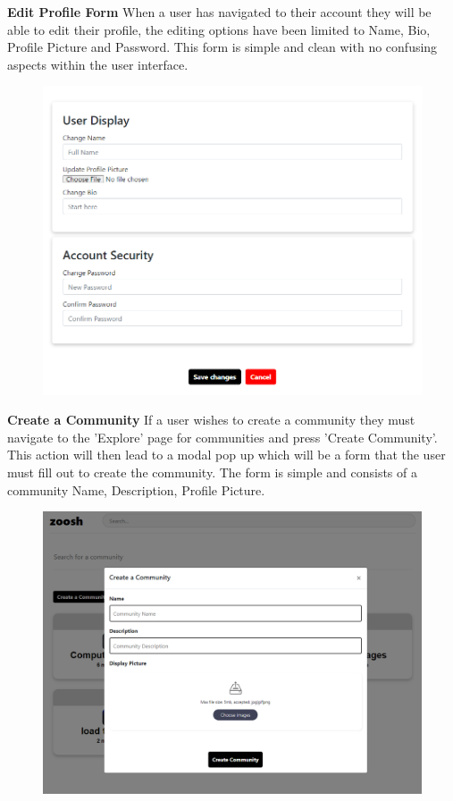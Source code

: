 \textbf{Edit Profile Form}
\newline
When a user has navigated to their account they will be able to edit their profile, the editing options have been limited to Name, Bio, Profile Picture and Password. This form is simple and clean with no confusing aspects within the user interface.

\begin{figure}[H]
  \centering
  \includegraphics[scale=0.45]{img/edit.PNG}
  \label{fig:Edit Profile Screen.}
\end{figure}

\textbf{Create a Community}
\newline
If a user wishes to create a community they must navigate to the 'Explore' page for communities and press 'Create Community'. This action will then lead to a modal pop up which will be a form that the user must fill out to create the community. The form is simple and consists of a community Name, Description, Profile Picture.

\begin{figure}[H]
  \centering
  \includegraphics[scale=0.35]{img/createcommunity.PNG}
  \label{fig:Create Community Modal Form.}
\end{figure}

